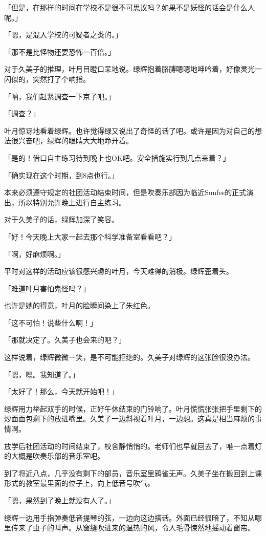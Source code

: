 \documentclass[UTF8]{ctexart}
\begin{document}
    「但是，在那样的时间在学校不是很不可思议吗？如果不是妖怪的话会是什么人呢。」

    「嗯，是混入学校的可疑者之类的。」

    「那不是比怪物还要恐怖一百倍。」

    对于久美子的推理，叶月目瞪口呆地说。绿辉抱着胳膊嗯嗯地呻吟着，好像灵光一闪似的，突然打了个响指。

    「呐，我们赶紧调查一下京子吧。」

    「调查？」

    叶月惊讶地看着绿辉。也许觉得绿又说出了奇怪的话了吧。或许是因为对自己的想法很兴奋吧，绿辉的眼睛大大地睁开着。

    「是的！借口自主练习待到晚上也OK吧。安全措施实行到几点来着？」

    「确实现在这个时期，到8点也行。」

    本来必须遵守规定的社团活动结束时间，但是吹奏乐部因为临近Sunfes的正式演出，所以特别允许晚上进行自主练习。

    对于久美子的话，绿辉加深了笑容。

    「好！今天晚上大家一起去那个科学准备室看看吧？」

    「啊，好麻烦啊。」

    平时对这样的活动应该很感兴趣的叶月，今天难得的消极。绿辉歪着头。

    「难道叶月害怕鬼怪吗？」

    也许是她的得意，叶月的脸瞬间染上了朱红色。

    「这不可怕！说些什么啊！」

    「那就决定了。久美子也会来的吧？」

    这样说着，绿辉微微一笑，是不可能拒绝的。久美子对绿辉的这张脸很没办法。

    「嗯，嗯。我知道了。」

    「太好了！那么，今天就开始吧！」

    绿辉用力举起双手的时候，正好午休结束的门铃响了。叶月慌慌张张把手里剩下的炒面面包剩下的放进嘴里。久美子一边斜视着叶月，一边想。这真是相当麻烦的事情啊。

    放学后社团活动的时间结束了，校舍静悄悄的。老师们也早就回去了，唯一点着灯的大概是吹奏乐部的音乐室吧。

    到了将近八点，几乎没有剩下的部员，音乐室里鸦雀无声。久美子坐在搬回到上课形式的教室最里面的位子上，向上低音号吹气。

    「嗯，果然到了晚上就没有人了。」

    绿辉一边用手指弹奏低音提琴的弦，一边向这边搭话。外面已经很暗了，不知从哪里传来了虫子的叫声。从窗缝吹进来的温热的风，令人毛骨悚然地摇动着窗帘。
\end{document}
